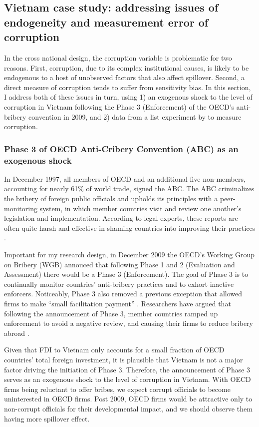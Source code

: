 \subsection{Vietnam case study: addressing issues of endogeneity and measurement error of corruption}

In the cross national design, the corruption variable is problematic for two reasons. First, corruption, due to its complex institutional causes, is likely to be endogenous to a host of unobserved factors that also affect spillover. Second, a direct measure of corruption tends to suffer from sensitivity bias. In this section, I address both of these issues in turn, using 1) an exogenous shock to the level of corruption in Vietnam following the Phase 3 (Enforcement) of the OECD's anti-bribery convention in 2009, and 2) data from a list experiment by \citet{Malesky2015} to measure corruption.

\subsubsection*{Phase 3 of OECD Anti-Cribery Convention (ABC) as an exogenous shock}

In December 1997, all members of OECD and an additional five non-members, accounting for nearly 61\% of world trade, signed the ABC. The ABC criminalizes the bribery of foreign public officials and upholds its principles with a peer-monitoring system, in which member countries visit and review one another's legislation and implementation. According to legal experts, these reports are often quite harsh and effective in shaming countries into improving their practices \citep{Tyler2011}.

Important for my research design, in December 2009 the OECD's Working Group on Bribery (WGB) annouced that following Phase 1 and 2 (Evaluation and Assessment) there would be a Phase 3 (Enforcement). The goal of Phase 3 is to continually monitor countries' anti-bribery practices and to exhort inactive enforcers. Noticeably, Phase 3 also removed a previous exception that allowed firms to make ``small facilitation payment'' \citep{Strauss2013}. Researchers have argued that following the announcement of Phase 3, member countries ramped up enforcement to avoid a negative review, and causing their firms to reduce bribery abroad \citep{Malesky2015b}. 

Given that FDI to Vietnam only accounts for a small fraction of OECD countries' total foreign investment, it is plausible that Vietnam is not a major factor driving the initiation of Phase 3. Therefore, the announcement of Phase 3 serves as an exogenous shock to the level of corruption in Vietnam. With OECD firms being reluctant to offer bribes, we expect corrupt officials to become uninterested in OECD firms. Post 2009, OECD firms would be attractive only to non-corrupt officials for their developmental impact, and we should observe them having more spillover effect.

